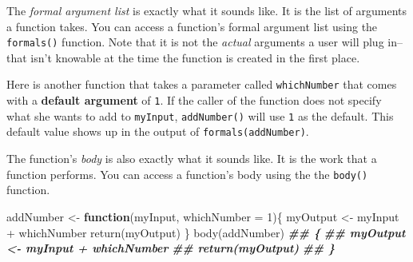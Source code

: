 \documentclass[
  12pt,
  krantz2]{krantz}
\makeatletter
\newenvironment{Shaded}{\begin{snugshade}}{\end{snugshade}}
\newcommand{\AttributeTok}[1]{\textcolor[rgb]{0.61,0.61,0.61}{#1}}
\newcommand{\CommentTok}[1]{\textcolor[rgb]{0.37,0.37,0.37}{\textit{#1}}}
\newcommand{\ControlFlowTok}[1]{\textcolor[rgb]{0.27,0.27,0.27}{\textbf{#1}}}
\newcommand{\DecValTok}[1]{\textcolor[rgb]{0.06,0.06,0.06}{#1}}
\newcommand{\DocumentationTok}[1]{\textcolor[rgb]{0.37,0.37,0.37}{\textbf{\textit{#1}}}}
\newcommand{\FunctionTok}[1]{\textcolor[rgb]{0,0,0}{#1}}
\newcommand{\NormalTok}[1]{#1}
\newcommand{\OtherTok}[1]{\textcolor[rgb]{0.37,0.37,0.37}{#1}}
\newcommand{\SpecialCharTok}[1]{\textcolor[rgb]{0,0,0}{#1}}
\newenvironment{kframe}{%
\medskip{}
\setlength{\fboxsep}{.8em}
 \def\at@end@of@kframe{}%
 \ifinner\ifhmode%
  \def\at@end@of@kframe{\end{minipage}}%
  \begin{minipage}{\columnwidth}%
 \fi\fi%
 \def\FrameCommand##1{\hskip\@totalleftmargin \hskip-\fboxsep
 \colorbox{shadecolor}{##1}\hskip-\fboxsep
     \hskip-\linewidth \hskip-\@totalleftmargin \hskip\columnwidth}%
 \MakeFramed {\advance\hsize-\width
   \@totalleftmargin\z@ \linewidth\hsize
   \@setminipage}}%
 {\par\unskip\endMakeFramed%
 \at@end@of@kframe}
\renewenvironment{Shaded}{\begin{kframe}}{\end{kframe}}
\makeatother
\begin{document}
The \emph{formal argument list} is exactly what it sounds like. It is the list of arguments a function takes. You can access a function's formal argument list using the \texttt{formals()} function. Note that it is not the \emph{actual} arguments a user will plug in--that isn't knowable at the time the function is created in the first place.

Here is another function that takes a parameter called \texttt{whichNumber} that comes with a \textbf{default argument} of \texttt{1}. If the caller of the function does not specify what she wants to add to \texttt{myInput}, \texttt{addNumber()} will use \texttt{1} as the default. This default value shows up in the output of \texttt{formals(addNumber)}.

\begin{Shaded}
\end{Shaded}

The function's \emph{body} is also exactly what it sounds like. It is the work that a function performs. You can access a function's body using the the \texttt{body()} function.

\begin{Shaded}
\begin{Highlighting}[]
\NormalTok{addNumber }\OtherTok{\textless{}{-}} \ControlFlowTok{function}\NormalTok{(myInput, }\AttributeTok{whichNumber =} \DecValTok{1}\NormalTok{)\{  }
\NormalTok{  myOutput }\OtherTok{\textless{}{-}}\NormalTok{ myInput }\SpecialCharTok{+}\NormalTok{ whichNumber}
  \FunctionTok{return}\NormalTok{(myOutput)}
\NormalTok{\}}
\FunctionTok{body}\NormalTok{(addNumber)}
\DocumentationTok{\#\# \{}
\DocumentationTok{\#\#     myOutput \textless{}{-} myInput + whichNumber}
\DocumentationTok{\#\#     return(myOutput)}
\DocumentationTok{\#\# \}}
\end{Highlighting}
\end{Shaded}
\end{document}
